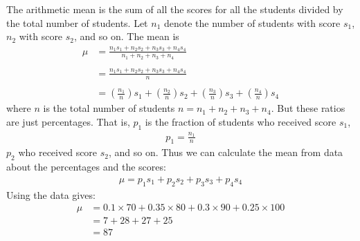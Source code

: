 \documentclass[12pt]{article}
\newenvironment{answer}{\vspace{1em}\color{blue!90!black}}{}
\newenvironment{answer}{\vspace{0em}\expandafter\comment}{\expandafter\endcomment}
\begin{document}
\begin{answer}
The arithmetic mean is the sum of all the scores for all the students divided by the total number of students. Let $n_1$ denote the number of students with score $s_1$, $n_2$ with score $s_2$, and so on. The mean is
\begin{align*}
\mu 
& = \frac{n_{1}s_{1}+n_{2}s_{2}+n_{3}s_{3}+n_{4}s_{4}}{n_{1}+n_{2}+n_{3}+n_{4}} \\ & \\
& = \frac{n_{1}s_{1}+n_{2}s_{2}+n_{3}s_{3}+n_{4}s_{4}}{n} \\ & \\
& = 
\left(\frac{n_{1}}{n}\right)s_{1} + \left(\frac{n_{2}}{n}\right)s_{2} + \left(\frac{n_{3}}{n}\right)s_{3} + \left(\frac{n_{4}}{n}\right)s_{4}
\end{align*}
where $n$ is the total number of students $n=n_{1}+n_{2}+n_{3}+n_{4}$. But these ratios are just percentages. That is, $p_{1}$ is the fraction of students who received score $s_{1}$,
\begin{align*}
p_{1} = \frac{n_{1}}{n}
\end{align*}
$p_{2}$ who received score $s_{2}$, and so on. Thus we can calculate the mean from data about the percentages and the scores:
\begin{align*}
\mu = p_{1}s_{1} + p_{2}s_{2} + p_{3}s_{3} + p_{4}s_{4}
\end{align*}
Using the data gives:
\begin{align*}
\mu 
& = 0.1 \times 70 + 0.35 \times 80 + 0.3 \times 90 + 0.25 \times 100 \\
& = 7 + 28 + 27 +  25 \\
& = 87
\end{align*}

\end{answer}
\end{document}
